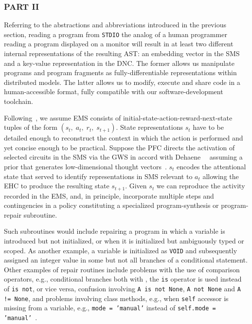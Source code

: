 


\subsubsection*{PART II}


Referring to the abstractions and abbreviations introduced in the previous section, reading a program from {\tt{STDIO}} \emdash{} the analog of a human programmer reading a program displayed on a monitor \emdash{} will result in \emdash{} at least \emdash{} two different internal representations of the resulting AST: an embedding vector in the SMS and a key-value representation in the DNC. The former allows us manipulate programs and program fragments as fully-differentiable representations within distributed models. The latter allows us to modify, execute and share code in a human-accessible format, fully compatible with our software-development toolchain.

Following~\cite{PritzeletalICML-17}, we assume EMS consists of initial-state-action-reward-next-state tuples of the form $(s_{t},\;a_{t},\;r_{t},\;s_{t+1})$. State representations $s_{t}$ have to be detailed enough to reconstruct the context in which the action is performed and yet concise enough to be practical. Suppose the PFC directs the activation of selected circuits in the SMS via the GWS in accord with Dehaene~\etal{}~\cite{DehaeneetalSCIENCE-17,Dehaene2014} assuming a prior that generates low-dimensional thought vectors~\cite{BengioCoRR-17}. $s_{t}$ encodes the attentional state that served to identify representations in SMS relevant to $a_{t}$ allowing the EHC to produce the resulting state $s_{t+1}$. Given $s_{t}$ we can reproduce the activity recorded in the EMS, and, in principle, incorporate multiple steps and contingencies in a policy constituting a specialized program-synthesis or program-repair subroutine.

Such subroutines would include repairing a program in which a variable is introduced but not initialized, or when it is initialized but ambiguously typed or scoped. As another example, a variable is initialized as {\tt{VOID}} and subsequently assigned an integer value in some but not all branches of a conditional statement. Other examples of repair routines include problems with the use of comparison operators, e.g., conditional branches both with \hmleq{}, the {\tt{is}} operator is used instead of {\tt{is not}}, or vice versa, confusion involving {\tt{A is not None}}, {\tt{A not None}} and {\tt{A != None}}, and problems involving class methods, e.g., when {\tt{self}} accessor is missing from a variable, e.g., {\tt{mode = 'manual'}} instead of {\tt{self.mode = 'manual'}}~\cite{ShinetalICLR-18b,DevlinetalICLR-18,WangetalCoRR-17}.


